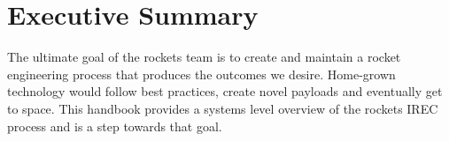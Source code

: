\chapter{Executive Summary} 
\label{sec:executive}

The ultimate goal of the rockets team is to create and maintain a rocket engineering process that produces the outcomes we desire. Home-grown technology would follow best practices, create novel payloads and eventually get to space. This handbook provides a systems level overview of the rockets IREC process and is a step towards that goal.